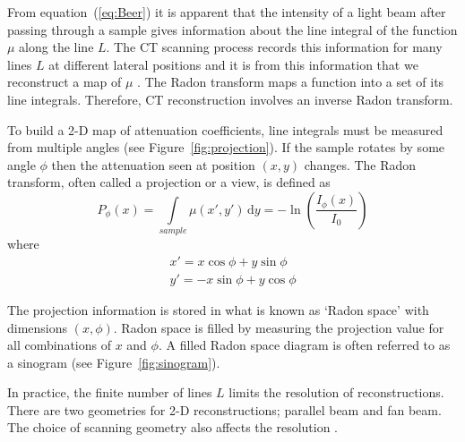 \documentclass[12pt]{article}
\begin{document}
From equation~(\ref{eq:Beer}) it is apparent that  the  intensity of a light beam after passing through a sample gives information about the line integral of the function $\mu$  along the line $L$. The CT scanning process records this information for many lines $L$ at different lateral positions and it is from this information that we reconstruct a map of $\mu$ \cite{natterer2001mathematics}.
The Radon transform maps a function into a set of its line integrals. Therefore, CT reconstruction involves an inverse Radon transform.



To build  a 2-D map of attenuation coefficients, line integrals must be measured from multiple angles (see Figure~\ref{fig:projection}). If the sample rotates by some angle $\phi$ then the attenuation seen at position $(x, y)$  changes.
The Radon transform, often called a projection or a view, is defined as
\begin{equation}
P_{\phi}(x) = \int\limits_{sample} \mu(x',y')\, \mathrm{d}y = -\ln\left(\frac{I_{\phi}(x)}{I_0}\right)
\end{equation}
where 
\begin{equation}
\begin{aligned}
x' = x\cos\phi + y\sin\phi \\
y' = -x\sin\phi + y\cos\phi
\end{aligned}
\end{equation}

The projection information is stored in what is known as `Radon space' with dimensions $(x, \phi)$. Radon space is filled by measuring the projection value for all combinations of $x$ and $\phi$. A filled Radon space diagram is often referred to as a sinogram (see Figure~\ref{fig:sinogram}).

In practice, the finite number of lines $L$ limits the resolution of reconstructions. There are two geometries for 2-D reconstructions; parallel beam and fan beam. The choice of scanning geometry also affects the resolution \cite{natterer2001mathematics}.
\end{document}
